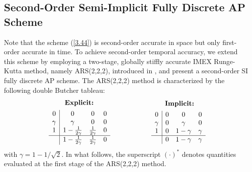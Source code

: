 \documentclass[a4paper,11pt,twoside]{article}
\numberwithin{equation}{section}
\numberwithin{figure}{section}
\numberwithin{table}{section}
\newcommand\eref[1]{(\ref{#1})}
\begin{document}
\subsection{Second-Order Semi-Implicit Fully Discrete AP Scheme}\label{sec35}
Note that the scheme \eref{3.44} is second-order accurate in space but only first-order accurate in time. To achieve second-order temporal
accuracy, we extend this scheme by employing a two-stage, globally stiffly accurate IMEX Runge-Kutta method, namely ARS(2,2,2), introduced
in \cite{Ascher_1997}, and present a second-order SI fully discrete AP scheme. The ARS(2,2,2) method is characterized by the following
double Butcher tableau:
\begin{equation}
\begin{split}
&\qquad~\textbf{Explicit:}\\&
\begin{array}{c|ccc}
0&0&0&0\\
\gamma&\gamma&0&0\\
1&1-\frac{1}{2\gamma}&\frac{1}{2\gamma}&0\\
\hline
&1-\frac{1}{2\gamma}&\frac{1}{2\gamma}&0
\end{array}
\end{split}
\begin{split}
\qquad\qquad\qquad&\qquad\textbf{Implicit:}\\&
\begin{array}{c|ccc} 
0&0&0&0\\
\gamma&0&\gamma&0\\ 
1&0&1-\gamma&\gamma\\
\hline
&0&1-\gamma&\gamma
\end{array}	
\end{split}
\label{3.45}
\end{equation}
with $\gamma=1-1/\sqrt{2}$. In what follows, the superscript $(\cdot)^*$ denotes quantities evaluated at the first stage of the ARS(2,2,2)
method.
	
\end{document}
